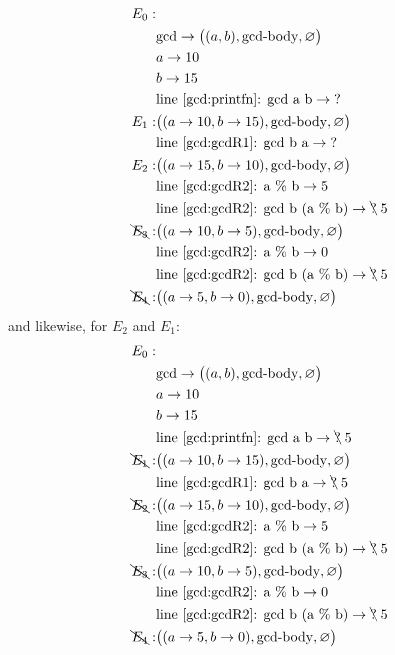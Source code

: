 \begin{align*}
  E_0:&\\
      & \text{gcd} \rightarrow \big((a, b), \text{gcd-body}, \varnothing\big)\\
      & a \rightarrow 10\\
      & b \rightarrow 15\\
      & \text{line~\ref{gcd:printfn}: gcd a b} \rightarrow \text{?}\\
  E_1:& \big((a \rightarrow 10, b \rightarrow 15), \text{gcd-body}, \varnothing\big)\\
      & \text{line~\ref{gcd:gcdR1}: gcd b a} \rightarrow \text{?}\\
  E_2:& \big((a \rightarrow 15, b \rightarrow 10), \text{gcd-body}, \varnothing\big)\\
      & \text{line~\ref{gcd:gcdR2}: a \% b} \rightarrow 5\\
      & \text{line~\ref{gcd:gcdR2}: gcd b (a \% b)} \rightarrow \bcancel{\text{?}}\; 5\\
  \bcancel{E_3}:& \big((a \rightarrow 10, b \rightarrow 5), \text{gcd-body}, \varnothing\big)\\
      & \text{line~\ref{gcd:gcdR2}: a \% b} \rightarrow 0\\
      & \text{line~\ref{gcd:gcdR2}: gcd b (a \% b)} \rightarrow \bcancel{\text{?}}\; 5\\
  \bcancel{E_4}:& \big((a \rightarrow 5, b \rightarrow 0), \text{gcd-body}, \varnothing\big)\\
\end{align*}
and likewise, for $E_2$ and $E_1$:
\begin{align*}
  E_0:&\\
      & \text{gcd} \rightarrow \big((a, b), \text{gcd-body}, \varnothing\big)\\
      & a \rightarrow 10\\
      & b \rightarrow 15\\
      & \text{line~\ref{gcd:printfn}: gcd a b} \rightarrow \bcancel{\text{?}}\; 5\\
  \bcancel{E_1}:& \big((a \rightarrow 10, b \rightarrow 15), \text{gcd-body}, \varnothing\big)\\
      & \text{line~\ref{gcd:gcdR1}: gcd b a} \rightarrow \bcancel{\text{?}}\; 5\\
  \bcancel{E_2}:& \big((a \rightarrow 15, b \rightarrow 10), \text{gcd-body}, \varnothing\big)\\
      & \text{line~\ref{gcd:gcdR2}: a \% b} \rightarrow 5\\
      & \text{line~\ref{gcd:gcdR2}: gcd b (a \% b)} \rightarrow \bcancel{\text{?}}\; 5\\
  \bcancel{E_3}:& \big((a \rightarrow 10, b \rightarrow 5), \text{gcd-body}, \varnothing\big)\\
      & \text{line~\ref{gcd:gcdR2}: a \% b} \rightarrow 0\\
      & \text{line~\ref{gcd:gcdR2}: gcd b (a \% b)} \rightarrow \bcancel{\text{?}}\; 5\\
  \bcancel{E_4}:& \big((a \rightarrow 5, b \rightarrow 0), \text{gcd-body}, \varnothing\big)\\
\end{align*}

